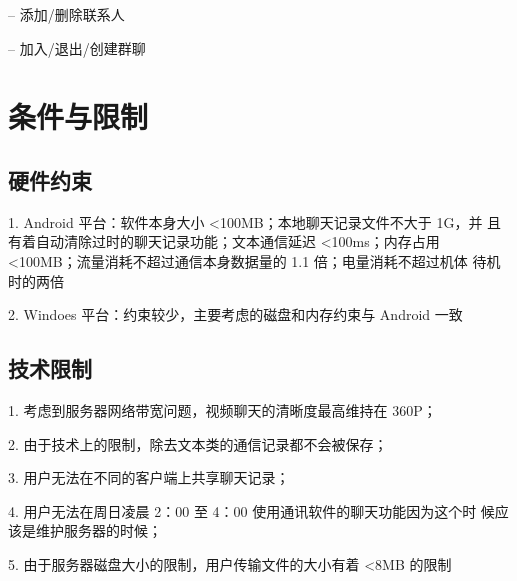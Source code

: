 – 添加/删除联系人

– 加入/退出/创建群聊

\section{条件与限制}
\subsection{硬件约束}

1. Android 平台：软件本身大小 <100MB；本地聊天记录文件不大于 1G，并
且有着自动清除过时的聊天记录功能；文本通信延迟 <100ms；内存占用
<100MB；流量消耗不超过通信本身数据量的 1.1 倍；电量消耗不超过机体
待机时的两倍

2. Windoes 平台：约束较少，主要考虑的磁盘和内存约束与 Android 一致

\subsection{技术限制}
1. 考虑到服务器网络带宽问题，视频聊天的清晰度最高维持在 360P；

2. 由于技术上的限制，除去文本类的通信记录都不会被保存；

3. 用户无法在不同的客户端上共享聊天记录；

4. 用户无法在周日凌晨 2：00 至 4：00 使用通讯软件的聊天功能因为这个时
候应该是维护服务器的时候；

5. 由于服务器磁盘大小的限制，用户传输文件的大小有着 <8MB 的限制
